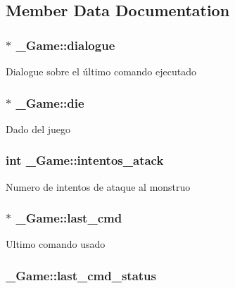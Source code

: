 \subsection{Member Data Documentation}
\hypertarget{struct__Game_a15beffb9162cf746b75d11aff2f59ab3}{
\subsubsection[{dialogue}]{$\ast$ \+\_\+\+Game\+::dialogue}}\label{struct__Game_a15beffb9162cf746b75d11aff2f59ab3}
Dialogue sobre el último comando ejecutado \hypertarget{struct__Game_a0d6009b5dcb080489c192a9198fa7d46}{
\subsubsection[{die}]{$\ast$ \+\_\+\+Game\+::die}}\label{struct__Game_a0d6009b5dcb080489c192a9198fa7d46}
Dado del juego \hypertarget{struct__Game_ac9e58373df5129e3ca8c783f688c29fe}{
\subsubsection[{intentos\+\_\+atack}]{\setlength{\rightskip}{0pt plus 5cm}int \+\_\+\+Game\+::intentos\+\_\+atack}}\label{struct__Game_ac9e58373df5129e3ca8c783f688c29fe}
Numero de intentos de ataque al monstruo \hypertarget{struct__Game_a47afef4b632256566d81da0f50e7a380}{
\subsubsection[{last\+\_\+cmd}]{$\ast$ \+\_\+\+Game\+::last\+\_\+cmd}}\label{struct__Game_a47afef4b632256566d81da0f50e7a380}
Ultimo comando usado \hypertarget{struct__Game_ab42af3e37c32a66d145a9e99dedecf88}{
\subsubsection[{last\+\_\+cmd\+\_\+status}]{ \+\_\+\+Game\+::last\+\_\+cmd\+\_\+status}}\label{struct__Game_ab42af3e37c32a66d145a9e99dedecf88}
